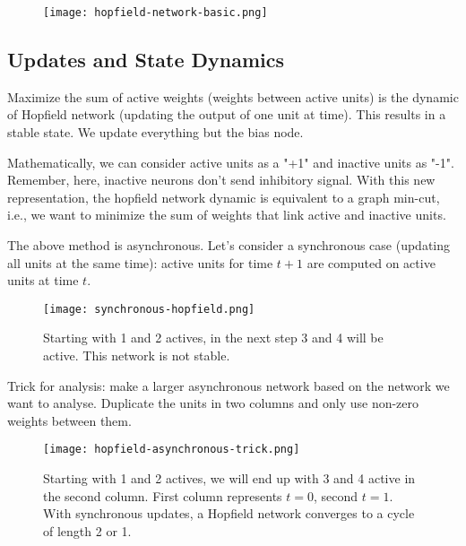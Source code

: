 \documentclass[main]{subfiles}
\begin{document}
\begin{figure}[H]
	\centering
	\texttt{[image: hopfield-network-basic.png]}
\end{figure}

\subsection{Updates and State Dynamics}

Maximize the sum of active weights (weights between active units) is the dynamic of Hopfield network (updating the output of one unit at time). This results in a stable state. We update everything but the bias node.

Mathematically, we can consider active units as a "+1" and inactive units as "-1". Remember, here, inactive neurons don't send inhibitory signal.
With this new representation, the hopfield network dynamic is equivalent to a graph min-cut, i.e., we want to minimize the sum of weights that link active and inactive units.

The above method is asynchronous.
Let's consider a synchronous case (updating all units at the same time): active units for time $t+1$ are computed on active units at time $t$.

\begin{figure}[H]
	\centering
	\texttt{[image: synchronous-hopfield.png]}
	\caption{Starting with 1 and 2 actives, in the next step 3 and 4 will be active. This network is not stable.}
\end{figure}

Trick for analysis: make a larger asynchronous network based on the network we want to analyse. Duplicate the units in two columns and only use non-zero weights between them.

\begin{figure}[H]
	\centering
	\texttt{[image: hopfield-asynchronous-trick.png]}
	\caption{Starting with 1 and 2 actives, we will end up with 3 and 4 active in the second column. First column represents $t=0$, second $t=1$. With synchronous updates, a Hopfield network converges to a cycle of length 2 or 1.}
\end{figure}
\end{document}
